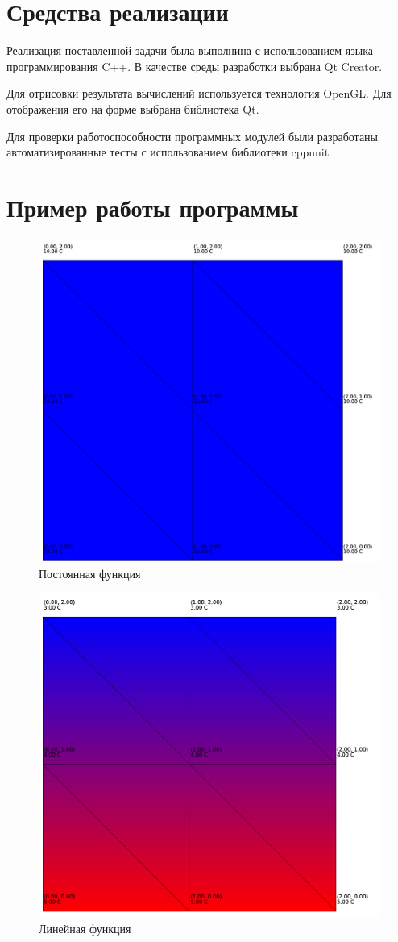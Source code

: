\documentclass[a4paper, 14pt]{extarticle}
\begin{document}
\clearpage
\section{Средства реализации}

Реализация поставленной задачи была выполнина с использованием языка
программирования C++. В качестве среды разработки выбрана Qt Creator.

Для отрисовки результата вычислений используется технология OpenGL. Для
отображения его на форме выбрана библиотека Qt.

Для проверки работоспособности программных модулей были разработаны
автоматизированные тесты с использованием библиотеки cppunit

\clearpage
\section{Пример работы программы}

\begin{figure}[h]
	\centering
	\includegraphics[width=0.5\linewidth]{images/test1}
	\caption[Рисунок]{Постоянная функция}
\end{figure}

\begin{figure}[h]
	\centering
	\includegraphics[width=0.5\linewidth]{images/test2}
	\caption[Рисунок]{Линейная функция}
\end{figure}
\end{document}
